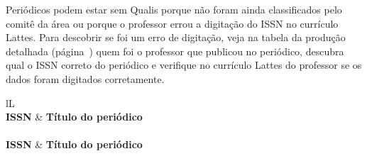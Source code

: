 \documentclass[12pt,brazil]{article}\usepackage[]{graphicx}\usepackage[]{xcolor}
\newcounter{tabela}
\begin{document}
\clearpage

Periódicos podem estar sem Qualis porque não foram ainda classificados pelo
comitê da área ou porque o professor errou a digitação do ISSN no currículo
Lattes. Para descobrir se foi um erro de digitação, veja na
tabela da produção detalhada (página~\pageref{tab:proddet}) quem foi o professor que publicou no periódico,
descubra qual o ISSN correto do periódico e verifique no currículo Lattes do
professor se os dados foram digitados corretamente.

\begin{ltabulary}{lL}
 \\
  \toprule
\textbf{ISSN} & \textbf{Título do periódico} \\
\midrule
\endfirsthead
{} \\
  \toprule
\textbf{ISSN} & \textbf{Título do periódico} \\
\midrule
\endhead
\midrule
{} \\
\endfoot
\bottomrule
\endlastfoot
 \\
\end{ltabulary}
\end{document}
